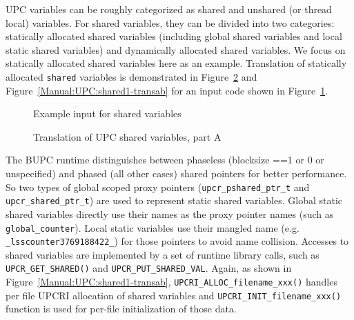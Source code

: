 UPC variables can be roughly categorized as shared and unshared (or thread
local) variables. 
For shared variables, they can be divided into two categories:
statically allocated shared variables (including global shared variables
and local static shared variables) and dynamically allocated shared
variables. 
We focus on statically allocated shared variables here as
an example.
Translation of statically allocated \lstinline{shared} variables is demonstrated in
Figure~\ref{Manual:UPC:shared1-transaa} and
Figure~\ref{Manual:UPC:shared1-transab} for an input code shown in
Figure~\ref{Manual:UPC:shared1}.
\begin{figure}[!h]
{\indent
  {\mySmallFontSize
    \begin{latexonly}
    
    \end{latexonly}
    \begin{htmlonly}
    
    \end{htmlonly}
  }
}
\caption{Example input for shared variables}
\label{Manual:UPC:shared1}
\end{figure}

\begin{figure}[!h]
{\indent
  {\mySmallFontSize
    \begin{latexonly}
    
    \end{latexonly}
    \begin{htmlonly}
    
    \end{htmlonly}
  }
}
\caption{Translation of UPC shared variables, part A}
\label{Manual:UPC:shared1-transaa}
\end{figure}

The BUPC runtime distinguishes between phaseless (blocksize ==1 or 0 or
unspecified) and phased (all other cases) shared
pointers for better performance. 
So two types of global scoped proxy pointers (\lstinline{upcr_pshared_ptr_t}
and \lstinline{upcr_shared_ptr_t}) are used to represent static shared variables. 
Global static shared variables directly use their names as the proxy
pointer names (such as \lstinline{global_counter}).
Local static variables use their mangled name (e.g. \lstinline{_lsscounter3769188422_}) for those pointers to
avoid name collision.
Accesses to shared variables are implemented by a set of runtime library
calls, such as \lstinline{UPCR_GET_SHARED()} and
\lstinline{UPCR_PUT_SHARED_VAL}.
Again, as shown in Figure~\ref{Manual:UPC:shared1-transab}, \lstinline{UPCRI_ALLOC_filename_xxx()} handles per file UPCRI allocation of shared variables and 
\lstinline{UPCRI_INIT_filename_xxx()} function is used for per-file
initialization of those data.


